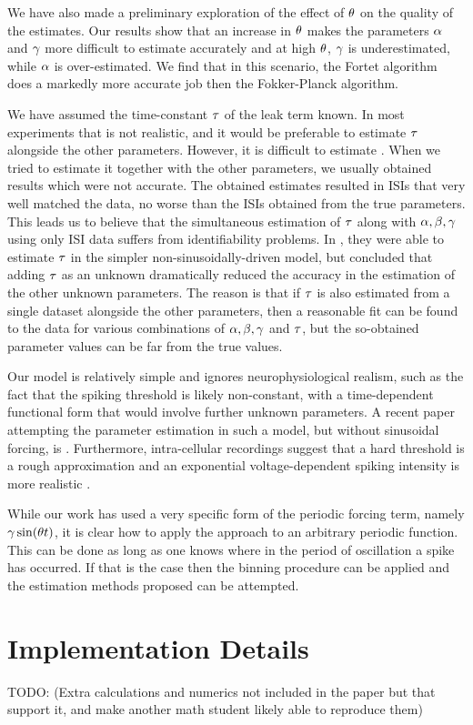 We have also made a preliminary exploration of the effect of ${ \theta}$ on the
quality of the estimates. Our results show that an increase in ${ \theta}$ makes the
parameters $\alpha$ and ${\gamma }$ more difficult to estimate accurately and at high
${ \theta}$, ${\gamma }$ is underestimated, while $\alpha$ is over-estimated. We find that in
this scenario, the Fortet algorithm does a markedly more accurate job then the
Fokker-Planck algorithm.
 
We have assumed  the time-constant ${\tau}$ of the leak term known. In most
experiments that is not realistic, and it would be preferable to estimate ${\tau}$
alongside the other parameters. However, it is difficult to estimate
\cite{DitlevsenLansky212}. When we tried to estimate it together with the other
parameters, we usually obtained results which were not accurate. The obtained
estimates resulted in ISIs that very well matched the data, no worse than the
ISIs obtained from the true parameters. This leads us to believe that the
simultaneous estimation of ${\tau}$ along with ${\alpha,\beta,{\gamma } }$ using only ISI data suffers
from identifiability problems. In \cite{Mullowney2008}, they were able to
estimate ${\tau}$ in the simpler non-sinusoidally-driven model, but concluded that
adding ${\tau}$ as an unknown dramatically reduced the accuracy in the estimation of
the other unknown parameters. The reason is that if ${\tau}$ is also estimated from
a single dataset alongside the other parameters, then a reasonable fit can be
found to the data for various combinations of ${\alpha,\beta,{\gamma } }$ and ${\tau}$, but the so-obtained
parameter values can be far from the true values.

Our model is relatively simple and ignores neurophysiological realism, such as
the fact that the spiking threshold is likely non-constant, with a
time-dependent functional form that would involve further unknown parameters. A
recent paper attempting the parameter estimation in such a model, but without
sinusoidal forcing, is \cite{Dong2011}. Furthermore, intra-cellular recordings
suggest that a hard threshold is a rough approximation and an exponential
voltage-dependent spiking intensity is more realistic \cite{Jahn2011}.

While our work has used a very specific form of the periodic forcing term,
namely ${\gamma } \sin({ \theta} t)$,  it is clear how to apply the approach to an arbitrary
periodic function. This can be done as long as one knows where in the period of
oscillation a spike has occurred. If that is the case then the binning procedure
can be applied and the estimation methods proposed can be attempted. 


\section{Implementation Details}
TODO: (Extra calculations and numerics not included in the paper but that
support it, and make another math  student likely able to reproduce them)
